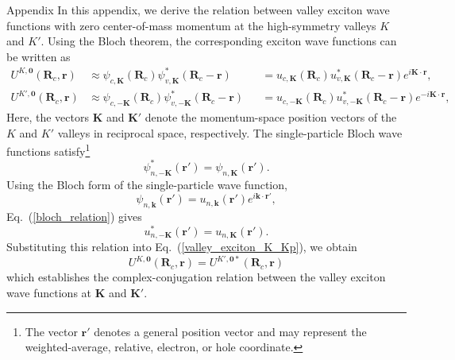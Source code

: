 \begin{Appx}{Appendix}
In this appendix, we derive the relation between valley exciton wave functions with zero center-of-mass momentum at the high-symmetry valleys $K$ and $K'$. Using the Bloch theorem, the corresponding exciton wave functions can be written as
\begin{equation}
\begin{aligned}
U^{K,\boldsymbol{0}} (\boldsymbol{R}_c,\boldsymbol{r})
&\approx
\psi_{c,\boldsymbol{K}}(\boldsymbol{R}_c)
\psi^{*}_{v,\boldsymbol{K}}(\boldsymbol{R}_c-\boldsymbol{r})
&&=
u_{c,\boldsymbol{K}}(\boldsymbol{R}_c)
u^{*}_{v,\boldsymbol{K}}(\boldsymbol{R}_c-\boldsymbol{r})
e^{i\boldsymbol{K}\cdot\boldsymbol{r}},
\\[0.5em]
U^{K',\boldsymbol{0}} (\boldsymbol{R}_c,\boldsymbol{r})
&\approx
\psi_{c,-\boldsymbol{K}}(\boldsymbol{R}_c)
\psi^{*}_{v,-\boldsymbol{K}}(\boldsymbol{R}_c-\boldsymbol{r})
&&=
u_{c,-\boldsymbol{K}}(\boldsymbol{R}_c)
u^{*}_{v,-\boldsymbol{K}}(\boldsymbol{R}_c-\boldsymbol{r})
e^{-i\boldsymbol{K}\cdot\boldsymbol{r}},
\end{aligned}
\label{valley_exciton_K_Kp}
\end{equation}
Here, the vectors $\boldsymbol{K}$ and $\boldsymbol{K}'$ denote the momentum-space position vectors of the $K$ and $K'$ valleys in reciprocal space, respectively. The single-particle Bloch wave functions satisfy\footnote{The vector $\boldsymbol{r}'$ denotes a general position vector and may represent the weighted-average, relative, electron, or hole coordinate.}
\begin{equation}
\psi^{*}_{n,-\boldsymbol{K}}(\boldsymbol{r}')
=
\psi_{n,\boldsymbol{K}}(\boldsymbol{r}').
\label{bloch_relation}
\end{equation}
Using the Bloch form of the single-particle wave function,
\begin{equation}
\psi_{n,\boldsymbol{k}}(\boldsymbol{r}')
=
u_{n,\boldsymbol{k}}(\boldsymbol{r}')
e^{i\boldsymbol{k}\cdot\boldsymbol{r}'},
\end{equation}
Eq.~(\ref{bloch_relation}) gives
\begin{equation}
u^{*}_{n,-\boldsymbol{K}}(\boldsymbol{r}')
=
u_{n,\boldsymbol{K}}(\boldsymbol{r}').
\end{equation}
Substituting this relation into Eq.~(\ref{valley_exciton_K_Kp}), we obtain
\begin{equation}
U^{K,\boldsymbol{0}} (\boldsymbol{R}_c,\boldsymbol{r})
=
U^{K',\boldsymbol{0}*} (\boldsymbol{R}_c,\boldsymbol{r})
\end{equation}
which establishes the complex-conjugation relation between the valley exciton wave functions at $\boldsymbol{K}$ and $\boldsymbol{K}'$.






\end{Appx}